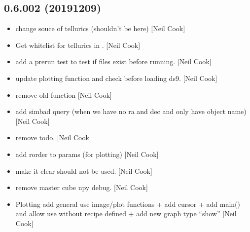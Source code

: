 \documentclass[a4paper,10pt,english]{report}
\begin{document}
\subsection{0.6.002 (2019\sphinxhyphen{}12\sphinxhyphen{}09)}
\label{\detokenize{misc/changelog:id36}}\begin{itemize}
\item {} 
 \sphinxhyphen{} change souce of tellurics (shouldn’t be
here) {[}Neil Cook{]}

\item {} 
Get whitelist for tellurics in . {[}Neil Cook{]}

\item {} 
 \sphinxhyphen{} add a pre\sphinxhyphen{}run test to test if
files exist before running. {[}Neil Cook{]}

\item {} 
 \sphinxhyphen{} update plotting function and
check before loading ds9. {[}Neil Cook{]}

\item {} 
 \sphinxhyphen{} remove old function 
{[}Neil Cook{]}

\item {} 
 \sphinxhyphen{} add simbad query (when we have no ra
and dec and only have object name) {[}Neil Cook{]}

\item {} 
 \sphinxhyphen{} remove todo. {[}Neil Cook{]}

\item {} 
 \sphinxhyphen{} add rorder to params (for plotting)
{[}Neil Cook{]}

\item {} 
 \sphinxhyphen{} make it clear 
should not be used. {[}Neil Cook{]}

\item {} 
 \sphinxhyphen{} remove master cube npy
debug. {[}Neil Cook{]}

\item {} 
Plotting \sphinxhyphen{} add general use image/plot functions + add cursor + add
main() and allow use without recipe defined + add new graph type
“show” {[}Neil Cook{]}


\end{itemize}
\end{document}
